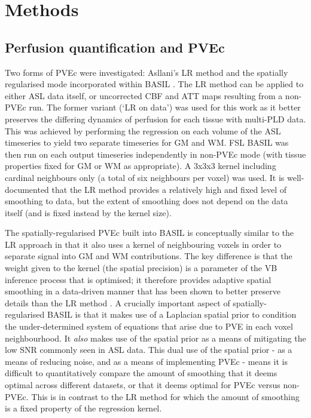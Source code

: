 \section{Methods}

\subsection{Perfusion quantification and PVEc}

Two forms of PVEc were investigated: Asllani's LR method \cite{Asllani2008} and the spatially regularised mode incorporated within BASIL \cite{Chappell2009, Chappell2011}. The LR method can be applied to either ASL data itself, or uncorrected  CBF and ATT maps resulting from a non-PVEc run. The former variant (`LR on data') was used for this work as it better preserves the differing dynamics of perfusion for each tissue with multi-PLD data. This was achieved by performing the regression on each volume of the ASL timeseries to yield two separate timeseries for GM and WM. FSL BASIL was then run on each output timeseries independently in non-PVEc mode (with tissue properties fixed for GM or WM as appropriate). A 3x3x3 kernel including cardinal neighbours only (a total of six neighbours per voxel) was used. It is well-documented that the LR method provides a relatively high and fixed level of smoothing to data, but the extent of smoothing does not depend on the data itself (and is fixed instead by the kernel size). 

The spatially-regularised PVEc built into BASIL is conceptually similar to the LR approach in that it also uses a kernel of neighbouring voxels in order to separate signal into GM and WM contributions. The key difference is that the weight given to the kernel (the spatial precision) is a parameter of the VB inference process that is optimised; it therefore provides adaptive spatial smoothing in a data-driven manner that has been shown to better preserve details than the LR method \cite{Zhao2017a}. A crucially important aspect of spatially-regularised BASIL is that it makes use of a Laplacian spatial prior to condition the under-determined system of equations that arise due to PVE in each voxel neighbourhood. It \textit{also} makes use of the spatial prior as a means of mitigating the low SNR commonly seen in ASL data. This dual use of the spatial prior - as a means of reducing noise, and as a means of implementing PVEc - means it is difficult to quantitatively compare the amount of smoothing that it deems optimal across different datasets, or that it deems optimal for PVEc versus non-PVEc. This is in contrast to the LR method for which the amount of smoothing is a fixed property of the regression kernel.

